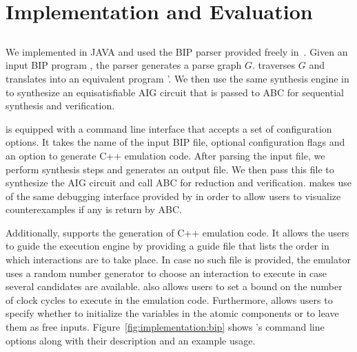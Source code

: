 \section{Implementation and Evaluation}
\label{sect-implem}



\subsection{\biptool{}} \label{chap:implementation:bip}
We implemented \biptool{} in JAVA and used the BIP parser provided 
freely in~\cite{verimagbiponline}. Given an input BIP program \Pm, 
the parser generates a parse graph $G$. \biptool{} traverses $G$ 
and translates \Pm into an equivalent \caig{} program 
\Pm'. We then use the same synthesis engine in \mytool{} to synthesize
an equisatisfiable AIG circuit \aigcircuit{} that is passed to ABC 
for sequential synthesis and verification.

\biptool{} is equipped with a command line interface that accepts a set
of configuration options. It takes the name of the input BIP file, optional 
configuration flags and an option to generate C++ emulation code. After 
parsing the input file, we perform synthesis steps and generates 
an output \caig{} file. 
We then pass this file to synthesize the AIG circuit \aigcircuit{}
and call ABC for reduction and verification. \biptool{} makes use of the same debugging
interface provided by \mytool{} in order to allow users to visualize counterexamples
if any is return by ABC. 

Additionally, \biptool{} supports the generation of C++ emulation code. It allows
the users to guide the execution engine by providing a guide file
that lists the order in which interactions are to take place. In case no such file 
is provided, the emulator uses a random number generator to choose an interaction to execute
in case several candidates  are available. \biptool{} also allows
users to set a bound on the number of clock cycles to execute in the emulation code. 
Furthermore, \biptool{} allows users to specify whether to initialize the variables 
in the atomic components or to leave them as free inputs. Figure~\ref{fig:implementation:bip}
shows \biptool's command line options along with their description and an example usage. 


